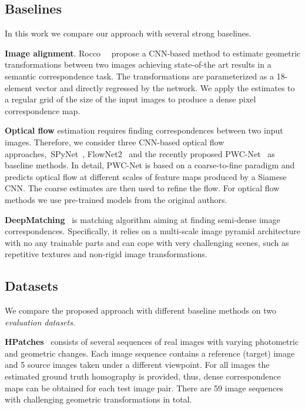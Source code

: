 \documentclass[10pt,twocolumn,letterpaper]{article}
\begin{document}
\subsection{Baselines}
\vspace{-1mm}
In this work we compare our approach with several strong baselines.

\noindent\textbf{Image alignment}. Rocco~\etal~\cite{Rocco17} propose a CNN-based method to estimate geometric transformations between two images achieving state-of-the art results in a semantic correspondence task. The transformations are parameterized as a 18-element vector and directly regressed by the network. We apply the estimates to a regular grid of the size of the input images to produce a dense pixel correspondence map.

\noindent\textbf{Optical flow} estimation requires finding correspondences between two input images. Therefore, we consider three CNN-based optical flow approaches,~\ie SPyNet~\cite{Spynet}, FlowNet2~\cite{FlowNet2} and the recently proposed PWC-Net~\cite{PWC-Net} as baseline methods. In detail, PWC-Net is based on a coarse-to-fine paradigm and predicts optical flow at different scales of feature maps produced by a Siamese CNN. The coarse estimates are then used to refine the flow. For optical flow methods we use pre-trained models from the original authors.

\noindent\textbf{DeepMatching}~\cite{DeepMatching} is matching algorithm aiming at finding semi-dense image correspondences. Specifically, it relies on a multi-scale image pyramid architecture with no any trainable parts and can cope with very challenging scenes, such as repetitive textures and non-rigid image transformations.

\vspace{-2mm}
\subsection{Datasets}\label{ssec:datasets}
\vspace{-1mm}
We compare the proposed approach with different baseline methods on two \textit{evaluation datasets}.

\noindent\textbf{HPatches}~\cite{HPatches} consists of several sequences of real images with varying photometric and geometric changes. Each image sequence contains a reference (target) image and 5 source images taken under a different viewpoint. For all images the estimated ground truth homography  is provided, thus, dense correspondence maps can be obtained for each test image pair. There are 59 image sequences with challenging geometric transformations in total. 
\end{document}
